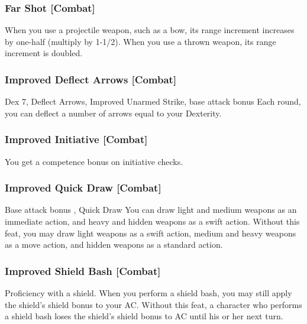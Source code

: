 \subsubsection{Far Shot [Combat]}
 When you use a projectile weapon, such as a bow, its range increment increases by one-half (multiply by 1-1/2). When you use a thrown weapon, its range increment is doubled.

\subsubsection{Improved Deflect Arrows [Combat]}
 Dex 7, Deflect Arrows, Improved Unarmed Strike, base attack bonus 
 Each round, you can deflect a number of arrows equal to your Dexterity.%


\subsubsection{Improved Initiative [Combat]}
 You get a  competence bonus on initiative checks.

\subsubsection{Improved Quick Draw [Combat]}
\featpres Base attack bonus , Quick Draw
\featben You can draw light and medium weapons as an immediate action, and heavy and hidden weapons as a swift action.
 Without this feat, you may draw light weapons as a swift action, medium and heavy weapons as a move action, and hidden weapons as a standard action.

\subsubsection{Improved Shield Bash [Combat]}
 Proficiency with a shield.
 When you perform a shield bash, you may still apply the shield's shield bonus to your AC.
 Without this feat, a character who performs a shield bash loses the shield's shield bonus to AC until his or her next turn.%

